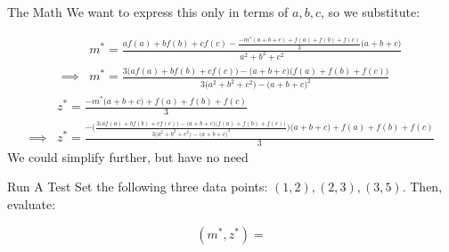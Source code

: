 \documentclass[10pt]{beamer}
\begin{document}
\begin{frame}{The Math}
    We want to express this only in terms of $a,b,c$, so we substitute:
\begin{tiny}
    \begin{align*}
        &m^* = \frac{af(a) + bf(b) + cf(c) - \frac{-m^*(a+b+c) + f(a) + f(b) + f(c)}{3}\Big(a+b+c\Big)}{a^2 + b^2 + c^2} \\ \implies &m^* = \frac{3\Big(af(a) + bf(b) + cf(c) \Big) - \Big(a+b+c\Big)\Big(f(a) + f(b) + f(c)\Big)}{3\Big(a^2 + b^2 + c^2\Big) - \Big(a + b + c\Big)^2}
    \end{align*}
    \begin{align*}
        &z^* = \frac{-m^*\Big(a + b + c \Big) + f(a) + f(b) + f(c)}{3} \\
        \implies &z^* = \frac{-\bigg(\frac{3\Big(af(a) + bf(b) + cf(c) \Big) - \Big(a+b+c\Big)\Big(f(a) + f(b) + f(c)\Big)}{3\Big(a^2 + b^2 + c^2\Big) - \Big(a + b + c\Big)^2} \bigg) \Big(a + b + c \Big) + f(a) + f(b) + f(c)}{3}
    \end{align*}
    We could simplify further, but have no need
\end{tiny}
\end{frame}

\begin{frame}{Run A Test}
    Set the following three data points: $(1,2), (2,3),(3,5)$. Then, evaluate:

    \[(m^*, z^*) = \]
\end{frame}
\end{document}
